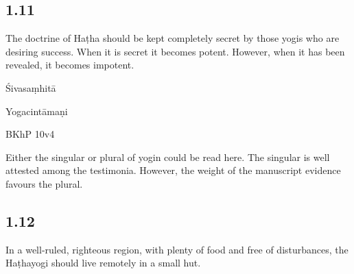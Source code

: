\begin{ekdosis}
\subsection*{1.11}
\begin{translation}[hp01_011]
The doctrine of Haṭha should be kept completely secret by those yogis who are desiring success. When it is secret it becomes potent. However, when it has been revealed, it becomes impotent.
\end{translation}

\begin{sources}[hp01_011]
Śivasaṃhitā

\begin{versinnote}
\end{versinnote}

\end{sources}

\begin{testimonia}[hp01_011]
Yogacintāmaṇi

\begin{versinnote}
\end{versinnote}

BKhP 10v4
\end{testimonia}

\begin{philcomm}[hp01_011]        
Either the singular or plural of yogin could be read here. The singular is well attested among the testimonia. However, the weight of the manuscript evidence favours the plural.  
\end{philcomm}

\subsection*{1.12}
\begin{translation}[hp01_012]
In a well-ruled, righteous region, with plenty of food and free of disturbances, the Haṭhayogi should live remotely in a small hut.
\end{translation}


\end{ekdosis}
